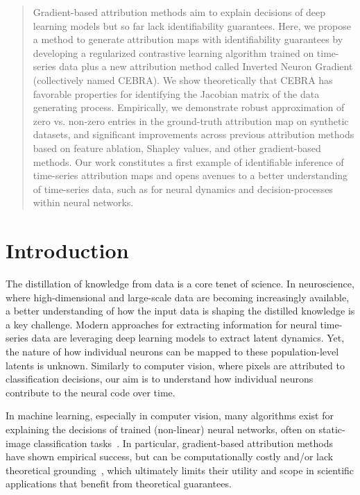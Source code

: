 \begin{abstract}
    Gradient-based attribution methods aim to explain decisions of deep learning models but so far lack identifiability guarantees. Here, we propose a method to generate attribution maps with identifiability guarantees by developing a regularized contrastive learning algorithm trained on time-series data plus a new attribution method called Inverted Neuron Gradient (collectively named CEBRA). We show theoretically that CEBRA has favorable properties for identifying the Jacobian matrix of the data generating process. Empirically, we demonstrate robust approximation of zero vs. non-zero entries in the ground-truth attribution map on synthetic datasets, and significant improvements across previous attribution methods based on feature ablation, Shapley values, and other gradient-based methods. Our work constitutes a first example of identifiable inference of time-series attribution maps and opens avenues to a better understanding of time-series data, such as for neural dynamics and decision-processes within neural networks.
\end{abstract}

\section{Introduction}

    The distillation of knowledge from data is a core tenet of science. In neuroscience, where high-dimensional and large-scale data are becoming increasingly available, a better understanding of how the input data is shaping the distilled knowledge is a key challenge. Modern approaches for extracting information for neural time-series data are leveraging deep learning models to extract latent dynamics. Yet, the nature of how individual neurons can be mapped to these population-level latents is unknown. Similarly to computer vision, where pixels are attributed to classification decisions, our aim is to understand how individual neurons contribute to the neural code over time.

    
    In machine learning, especially in computer vision, many algorithms exist for explaining the decisions of trained (non-linear) neural networks, often on static-image classification tasks~\citep{samek2019explainable,Ancona2017TowardsBU,Shrikumar2016NotJA,Sundararajan2017AxiomaticAF,Montavon2015ExplainingNC,Simonyan2013DeepIC,lundberg2017unified}. In particular, gradient-based attribution methods have shown empirical success, but can be computationally costly and/or lack theoretical grounding~\citep{Simonyan2013DeepIC,lundberg2017unified}, which ultimately limits their utility and scope in scientific applications that benefit from theoretical guarantees.
    

